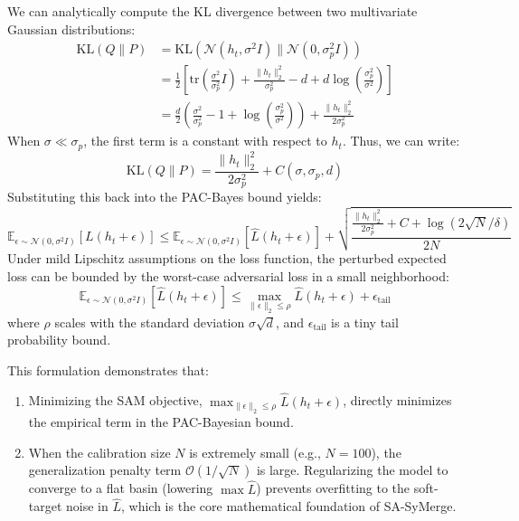 \documentclass{article}
\theoremstyle{plain}
\theoremstyle{definition}
\theoremstyle{remark}
\begin{document}
We can analytically compute the KL divergence between two multivariate Gaussian distributions:
\begin{align}
    \text{KL}(Q \parallel P) &= \text{KL}(\mathcal{N}(h_t, \sigma^2 I) \parallel \mathcal{N}(0, \sigma_p^2 I)) \nonumber \\
    &= \frac{1}{2} \left[ \text{tr}\left( \frac{\sigma^2}{\sigma_p^2} I \right) + \frac{\|h_t\|_2^2}{\sigma_p^2} - d + d \log\left(\frac{\sigma_p^2}{\sigma^2}\right) \right] \nonumber \\
    &= \frac{d}{2} \left( \frac{\sigma^2}{\sigma_p^2} - 1 + \log\left(\frac{\sigma_p^2}{\sigma^2}\right) \right) + \frac{\|h_t\|_2^2}{2\sigma_p^2}
\end{align}
When $\sigma \ll \sigma_p$, the first term is a constant with respect to $h_t$. Thus, we can write:
\begin{equation}
    \text{KL}(Q \parallel P) = \frac{\|h_t\|_2^2}{2\sigma_p^2} + C(\sigma, \sigma_p, d)
\end{equation}
Substituting this back into the PAC-Bayes bound yields:
\begin{equation}
    \mathbb{E}_{\epsilon \sim \mathcal{N}(0, \sigma^2 I)} [L(h_t + \epsilon)] \le \mathbb{E}_{\epsilon \sim \mathcal{N}(0, \sigma^2 I)} [\hat{L}(h_t + \epsilon)] + \sqrt{\frac{\frac{\|h_t\|_2^2}{2\sigma_p^2} + C + \log(2\sqrt{N}/\delta)}{2N}}
\end{equation}
Under mild Lipschitz assumptions on the loss function, the perturbed expected loss can be bounded by the worst-case adversarial loss in a small neighborhood:
\begin{equation}
    \mathbb{E}_{\epsilon \sim \mathcal{N}(0, \sigma^2 I)} [\hat{L}(h_t + \epsilon)] \le \max_{\|\epsilon\|_2 \le \rho} \hat{L}(h_t + \epsilon) + \epsilon_{\text{tail}}
\end{equation}
where $\rho$ scales with the standard deviation $\sigma \sqrt{d}$, and $\epsilon_{\text{tail}}$ is a tiny tail probability bound.

This formulation demonstrates that:
\begin{enumerate}
    \item Minimizing the SAM objective, $\max_{\|\epsilon\|_2 \le \rho} \hat{L}(h_t + \epsilon)$, directly minimizes the empirical term in the PAC-Bayesian bound.
    \item When the calibration size $N$ is extremely small (e.g., $N=100$), the generalization penalty term $\mathcal{O}(1/\sqrt{N})$ is large. Regularizing the model to converge to a flat basin (lowering $\max \hat{L}$) prevents overfitting to the soft-target noise in $\hat{L}$, which is the core mathematical foundation of SA-SyMerge.
\end{enumerate}
\end{document}
